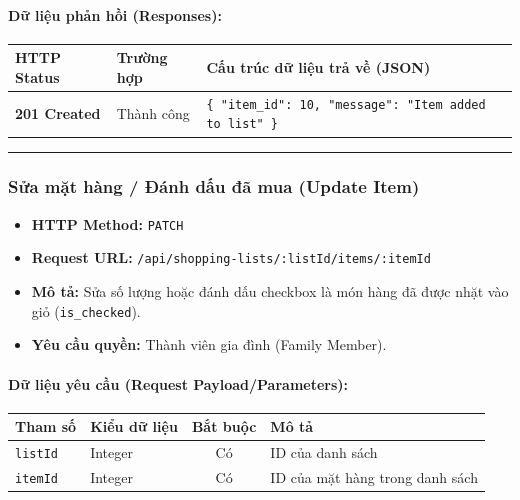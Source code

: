 \documentclass[12pt,a4paper]{article}
\begin{document}
\paragraph{Dữ liệu phản hồi (Responses):}
\begin{longtable}{|>{\raggedright\arraybackslash}p{2.8cm}|>{\raggedright\arraybackslash}p{3.2cm}|>{\raggedright\arraybackslash}p{8.0cm}|}
\hline
\textbf{HTTP Status} & \textbf{Trường hợp} & \textbf{Cấu trúc dữ liệu trả về (JSON)} \\ \hline
\endhead
\textbf{201 Created} & Thành công & \texttt{\{ "item\_id": 10, "message": "Item added to list" \}} \\ \hline
\end{longtable}

\vskip 0.4cm
\noindent\rule{\textwidth}{0.3pt}
\vskip 0.4cm

\subsubsection{Sửa mặt hàng / Đánh dấu đã mua (Update Item)}
\begin{itemize}[leftmargin=*]
    \item \textbf{HTTP Method:} \texttt{PATCH}
    \item \textbf{Request URL:} \texttt{/api/shopping-lists/:listId/items/:itemId}
    \item \textbf{Mô tả:} Sửa số lượng hoặc đánh dấu checkbox là món hàng đã được nhặt vào giỏ (\texttt{is\_checked}).
    \item \textbf{Yêu cầu quyền:} Thành viên gia đình (Family Member).
\end{itemize}

\paragraph{Dữ liệu yêu cầu (Request Payload/Parameters):}
\begin{longtable}{|>{\raggedright\arraybackslash}p{2.8cm}|>{\raggedright\arraybackslash}p{2.2cm}|c|>{\raggedright\arraybackslash}p{7.0cm}|}
\hline
\textbf{Tham số} & \textbf{Kiểu dữ liệu} & \textbf{Bắt buộc} & \textbf{Mô tả} \\ \hline
\endhead
\texttt{listId} & Integer & Có & ID của danh sách \\ \hline
\texttt{itemId} & Integer & Có & ID của mặt hàng trong danh sách \\ \hline
\end{longtable}
\end{document}
